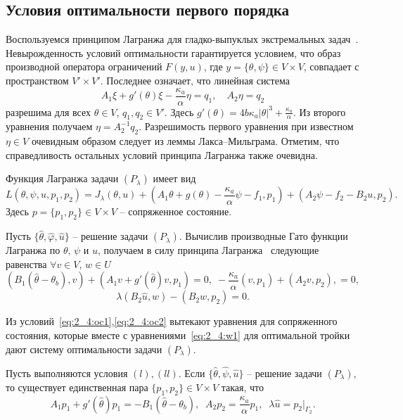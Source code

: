 \subsection{Условия оптимальности первого порядка}
\label{subsec:ch2/sec4/optimality}

Воспользуемся принципом Лагранжа для
гладко-выпуклых экстремальных задач~\cite{11,10}.
Невырожденность условий оптимальности гарантируется условием, что образ
производной оператора ограничений $F(y, u)$, где $y=\{\theta, \psi\} \in V\times V$,
совпадает с пространством $V' \times V'$.
Последнее означает, что линейная система
\[
    A_1\xi + g'(\theta)\xi - \frac{\kappa_a}{\alpha}\eta = q_1, \quad
    A_2\eta = q_2
\]
разрешима для всех $\theta\in V$, $q_1,q_2\in V'$.
Здесь $g'(\theta)=4b\kappa_a|\theta|^3+\frac{\kappa_a}{\alpha}$.
Из второго уравнения получаем $\eta = A_2^{-1}q_2$.
Разрешимость первого уравнения при известном $\eta\in V$
очевидным образом следует из леммы Лакса--Мильграма.
Отметим, что справедливость остальных условий принципа Лагранжа также очевидна.

Функция Лагранжа задачи $(P_\lambda)$
имеет вид
\[
    L (\theta, \psi, u, p_1, p_2) = J_\lambda(\theta, u)
    + \left( A_1 \theta + g (\theta)
    - \frac{\kappa_a}{\alpha}\psi - f_1, p_1 \right)
    + (A_2 \psi - f_2 - B_2 u, p_2).
\]
Здесь $p=\{p_1,p_2\} \in V \times V$ -- сопряженное состояние.

Пусть $\{\hat{\theta}, \hat{\varphi}, \hat{u} \}$ -- решение задачи $(P_\lambda)$.
Вычислив производные Гато функции Лагранжа по $\theta,\,\psi$ и $u$, получаем
в силу принципа Лагранжа~\cite[Гл. 2, теорема 1.5]{10} следующие равенства
$\forall v\in V,\, w \in U$
\begin{equation}
    \label{eq:2_4:oc1}
    (B_1(\hat{\theta} -\theta_b), v) + (A_1 v + g'(\hat{\theta})v, p_1)=0,\;
    -\frac{\kappa_a}{\alpha}(v ,p_1)+ (A_2 v,p_2), = 0,
\end{equation}
\begin{equation}
    \label{eq:2_4:oc2}
    \lambda(B_2\hat{u},w) - (B_2 w, p_2) = 0.
\end{equation}

Из условий~\eqref{eq:2_4:oc1},\eqref{eq:2_4:oc2}
вытекают уравнения для сопряженного состояния,
которые вместе с уравнениями~\eqref{eq:2_4:w1}
для оптимальной тройки дают систему оптимальности задачи $(P_\lambda)$.

\begin{theorem}
    Пусть выполняются условия $(l), (ll)$.
    Если $\{\hat{\theta}, \hat{\psi}, \hat{u}\}$ -- решение
    задачи $(P_\lambda)$, то существует единственная пара
    $\{p_1, p_2 \} \in V\times V$ такая, что
    \begin{equation}
        \label{eq:2_4:as}
        A_1 p_1+g'(\hat{\theta}) p_1=-B_1(\hat{\theta} -\theta_b),\;\;
        A_2 p_2=\frac{\kappa_a}{\alpha}p_1,\;\;
        \lambda\hat{u}=p_2|_{\Gamma_2}.
    \end{equation}
\end{theorem}

